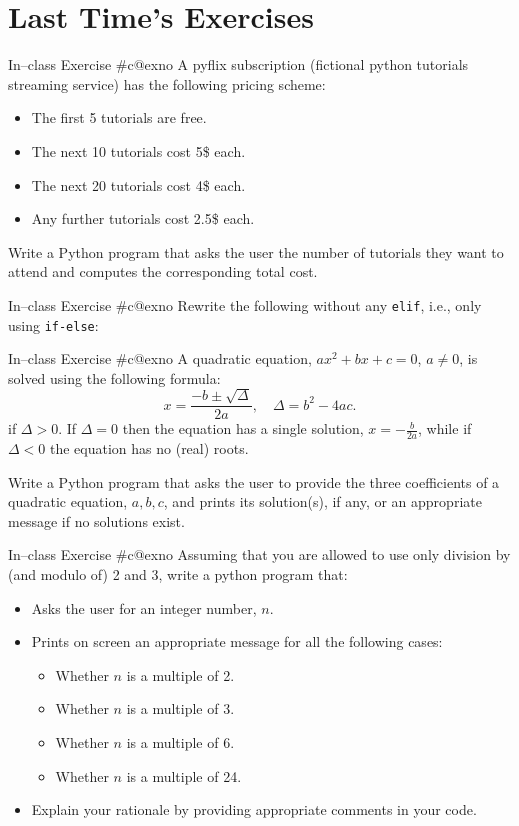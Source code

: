 \documentclass[aspectratio=169, 12pt, xcolor=table]{beamer}
\makeatletter
\newcommand{\arabicthree}[1]{\expandafter\@arabicthree\csname c@#1\endcsname}
\newcommand{\@arabicthree}[1]{\ifnum #1<100 0\fi\ifnum #1<10 0\fi\number#1}
\newcounter{exno}
\newcommand{\exno}{\stepcounter{exno}In--class Exercise \#\arabicthree{exno}}
\makeatother
\begin{document}
	\section{Last Time's Exercises}\label{sec:last-time-s-exercises}
	
	\sectionframe
	
	\begin{frame}{\exno}
		A pyflix subscription (fictional python tutorials streaming service) has the following pricing scheme:
		\begin{itemize}
			\item The first 5 tutorials are free.
			\item The next 10 tutorials cost 5\$ each.
			\item The next 20 tutorials cost 4\$ each.
			\item Any further tutorials cost 2.5\$ each.
		\end{itemize}
		Write a Python program that asks the user the number of tutorials they want to attend and computes the corresponding total cost.
	\end{frame}
	
	\begin{frame}{\exno}
		Rewrite the following without any \texttt{elif}, i.e., only using \texttt{if-else}:
		
	\end{frame}
	
	\begin{frame}{\exno}
		A quadratic equation, $ax^2+bx+c=0$, $a\neq0$, is solved using the following formula:
		\[x=\frac{-b\pm\sqrt{\Delta}}{2a},\quad \Delta=b^2-4ac.\]
		if $\Delta>0$. If $\Delta=0$ then the equation has a single solution, $x=-\frac{b}{2a}$, while if $\Delta<0$ the equation has no (real) roots.
		
		Write a Python program that asks the user to provide the three coefficients of a quadratic equation, $a,b,c$, and prints its solution(s), if any, or an appropriate message if no solutions exist.
	\end{frame}
	
	\begin{frame}{\exno}
		Assuming that you are allowed to use only division by (and modulo of) 2 and 3, write a python program that:
		\begin{itemize}
			\item Asks the user for an integer number, $n$.
			\item Prints on screen an appropriate message for all the following cases:
			\begin{itemize}
				\item Whether $n$ is a multiple of 2.
				\item Whether $n$ is a multiple of 3.
				\item Whether $n$ is a multiple of 6.
				\item Whether $n$ is a multiple of 24.
			\end{itemize}
			\item Explain your rationale by providing appropriate comments in your code.
		\end{itemize}
	\end{frame}
	
\end{document}
